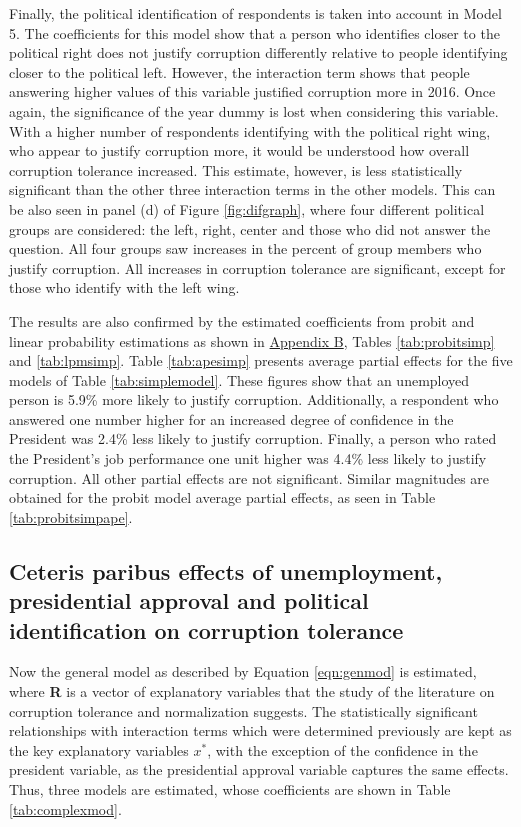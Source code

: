 \documentclass[floatsintext,man]{apa7}\usepackage[]{graphicx}\usepackage[]{color}
\begin{document}
Finally, the political identification of respondents is taken into account in Model 5. The coefficients for this model show that a person who identifies closer to the political right does not justify corruption differently relative to people identifying closer to the political left. However, the interaction term shows that people answering higher values of this variable justified corruption more in 2016. Once again, the significance of the year dummy is lost when considering this variable. With a higher number of respondents identifying with the political right wing, who appear to justify corruption more, it would be understood how overall corruption tolerance increased. This estimate, however, is less statistically significant than the other three interaction terms in the other models. This can be also seen in panel (d) of Figure \ref{fig:difgraph}, where four different political groups are considered: the left, right, center and those who did not answer the question. All four groups saw increases in the percent of group members who justify corruption. All increases in corruption tolerance are significant, except for those who identify with the left wing.  

The results are also confirmed by the estimated coefficients from probit and linear probability estimations as shown in \hyperref[app:sec]{Appendix B}, Tables \ref{tab:probitsimp} and \ref{tab:lpmsimp}. Table \ref{tab:apesimp} presents average partial effects for the five models of Table \ref{tab:simplemodel}. These figures show that an unemployed person is 5.9\% more likely to justify corruption. Additionally, a respondent who answered one number higher for an increased degree of confidence in the President was 2.4\% less likely to justify corruption. Finally, a person who rated the President's job performance one unit higher was 4.4\% less likely to justify corruption. All other partial effects are not significant. Similar magnitudes are obtained for the probit model average partial effects, as seen in Table \ref{tab:probitsimpape}. 

\subsection{Ceteris paribus effects of unemployment, presidential approval and political identification on corruption tolerance}

Now the general model as described by Equation \ref{eqn:genmod} is estimated, where \textbf{R} is a vector of explanatory variables that the study of the literature on corruption tolerance and normalization suggests. The statistically significant relationships with interaction terms which were determined previously are kept as the key explanatory variables $x^*$, with the exception of the confidence in the president variable, as the presidential approval variable captures the same effects. Thus, three models are estimated, whose coefficients are shown in Table \ref{tab:complexmod}.
\end{document}
